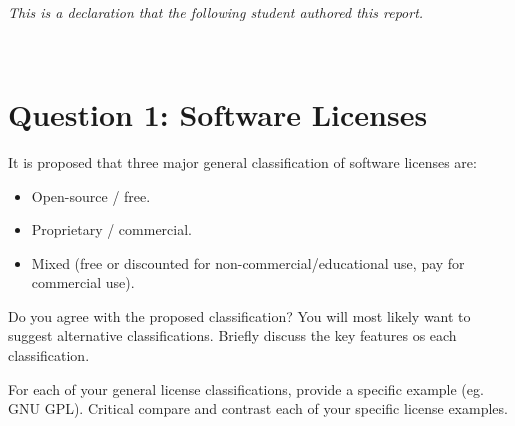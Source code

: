 \documentclass[12pt, onecolumn]{witseiepaper}
\begin{document}
\begin{titlepage}
\begin{center}
		\begin{minipage}
			{1	\textwidth} 
			\begin{flushright}
				\center\large{\textit{\\This is a declaration that the following student authored this report.}} \\
			\end{flushright}
		\end{minipage}\\[2cm]
							
		\begin{minipage}
		 	{1	\textwidth} 
		 	\begin{flushleft}
		 	
		  			 			 	
		  	\end{flushleft}
		 \end{minipage}
	\end{center}

\end{titlepage}	
	

\tableofcontents
\newpage


\section{Question 1: \newline Software Licenses}
It is proposed that three major general classification of software licenses are:\cite{question_1}
\begin{itemize}
	\item Open-source / free.
	\item Proprietary / commercial.
	\item Mixed (free or discounted for non-commercial/educational use, pay for commercial use).
\end{itemize}

Do you agree with the proposed classification?  You will most likely want to suggest alternative classifications.  Briefly discuss the key features os each classification.

For each of your general license classifications, provide a specific example (eg. GNU GPL).
Critical compare and contrast each of your specific license examples.
\end{document}
